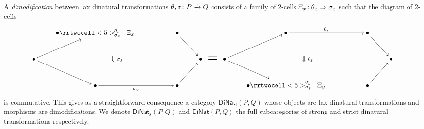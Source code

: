 \begin{definition}\label{laxmodifa}
A \emph{dimodification} between lax dinatural transformations $\theta,\sigma \colon P \xrightarrow{..}Q$ consists of a family of 2-cells $\Xi_x \colon \theta_x \Rightarrow \sigma_x$ such that the diagram of 2-cells
\[
\xymatrix{
& \bullet \rrtwocell<5>^{\theta_x}_{\sigma_x}{\;\;\Xi_x}&& \bullet \ar[dr]& & & \bullet \ar[rr]^{\theta_x}&& \bullet \ar[dr]& \\
\bullet \ar@{}[rrrr]|{\Sarrow\;\;\sigma_f}\ar[dr]\ar[ur]&& && \bullet \ar@{}[r]|{\text{\huge =}}& \bullet \ar@{}[rrrr]|{\Sarrow\;\;\theta_f}\ar[dr]\ar[ur]&& && \bullet \\ 
& \bullet \ar[rr]_{\sigma_y}&& \bullet \ar[ur]&& & \bullet \rrtwocell<5>^{\theta_y}_{\sigma_y}{\;\;\Xi_y}&& \bullet \ar[ur]&
}
\]
is commutative. This gives as a straightforward consequence a category $\textsf{DiNat}_\text{l}(P,Q)$ whose objects are lax dinatural transformations and morphisms are dimodifications. We denote $\textsf{DiNat}_\text{s}(P,Q)$ and $\textsf{DiNat}(P,Q)$ the full subcategories of strong and strict dinatural transformations respectively.
\end{definition}
